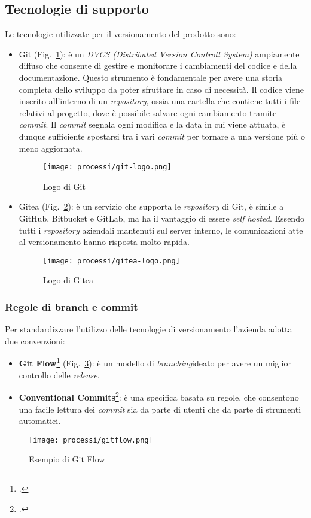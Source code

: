\subsection{Tecnologie di supporto}
Le tecnologie utilizzate per il versionamento del prodotto sono:
\begin{itemize}
    \item Git (Fig.~\ref{fig:logo-git}): è un \emph{DVCS (Distributed Version Controll System)} ampiamente diffuso che consente di gestire e monitorare i cambiamenti del codice e della documentazione. Questo strumento è fondamentale per avere una storia completa dello sviluppo da poter sfruttare in caso di necessità. Il codice viene inserito all'interno di un \emph{repository}, ossia una cartella che contiene tutti i file relativi al progetto, dove è possibile salvare ogni cambiamento tramite \emph{commit}. Il \emph{commit} segnala ogni modifica e la data in cui viene attuata, è dunque sufficiente spostarsi tra i vari \emph{commit} per tornare a una versione più o meno aggiornata.  
    
    \begin{figure}[!h] 
        \centering 
        \texttt{[image: processi/git-logo.png]} 
        \caption{Logo di Git}
        \label{fig:logo-git}
      \end{figure}

    \item Gitea (Fig.~\ref{fig:logo-gitea}): è un servizio che supporta le \emph{repository} di Git, è simile a GitHub, Bitbucket e GitLab, ma ha il vantaggio di essere \emph{\gls{self hosted}}\glsfirstoccur. 
    Essendo tutti i \emph{repository} aziendali mantenuti sul server interno, le comunicazioni atte al versionamento hanno risposta molto rapida.

    \begin{figure}[!h] 
        \centering 
        \texttt{[image: processi/gitea-logo.png]} 
        \caption{Logo di Gitea}
        \label{fig:logo-gitea}
      \end{figure}
\end{itemize}

\subsubsection{Regole di branch e commit}
Per standardizzare l'utilizzo delle tecnologie di versionamento l'azienda adotta due convenzioni:
\begin{itemize}
    \item \textbf{Git Flow}\footcite{site:gitflow} (Fig.~\ref{fig:schema-gitflow}): è un modello di \emph{\gls{branching}}\glsfirstoccur ideato per avere un miglior controllo delle \emph{release}.
    \item \textbf{Conventional Commits}\footcite{site:commits}: è una specifica basata su regole, che consentono una facile lettura dei \emph{commit} sia da parte di utenti che da parte di strumenti automatici. 
\end{itemize}

\begin{figure}[!h] 
    \centering 
    \texttt{[image: processi/gitflow.png]} 
    \caption{Esempio di Git Flow}
    \label{fig:schema-gitflow}
  \end{figure}

  